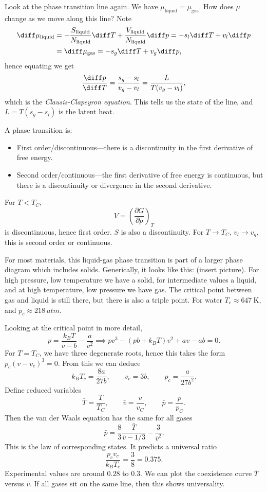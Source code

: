 \documentclass[12pt]{article}
\begin{document}
Look at the phase transition line again. We have $\mu_{\mathrm{liquid}}  = \mu_{\mathrm{gas}}$. How does $\mu$ change as we move along this line? Note
\begin{align*}
	\diff \mu_{\mathrm{liquid}} &= - \frac{S_{\mathrm{liquid}}}{N_{\mathrm{liquid}}} \diff T + \frac{V_{\mathrm{liquid}}}{N_{\mathrm{liquid}}} \diff p = - s_l \diff T + v_l \diff p \\
				    &= \diff \mu_{\mathrm{gas}} = - s_g \diff T + v_g \diff p,
\end{align*}
hence equating we get
\[
\frac{\diff p}{\diff T} = \frac{s_g - s_l}{v_g - v_l} = \frac{L}{T(v_g - v_l)},
\]
which is the \emph{Clausis-Clapeyron equation}. This tells us the state of the line, and $L = T(s_g - s_l)$ is the latent heat.

A phase transition is:
\begin{itemize}
	\item First order/discontinuous---there is a discontinuity in the first derivative of free energy.
	\item Second order/continuous---the first derivative of free energy is continuous, but there is a discontinuity or divergence in the second derivative.
\end{itemize}
For $T < T_C$,
\[
V = \left( \frac{\partial G}{\partial p} \right)_T
\]
is discontinuous, hence first order. $S$ is also a discontinuity. For $T \to T_C$, $v_l \to v_g$, this is second order or continuous.

For most materials, this liquid-gas phase transition is part of a larger phase diagram which includes solids. Generically, it looks like this: (insert picture). For high pressure, low temperature we have a solid, for intermediate values a liquid, and at high temperature, low pressure we have gas. The critical point between gas and liquid is still there, but there is also a triple point. For water $T_c \approx \qty{647}{\kelvin}$, and $p_c \approx \qty{218}{atm}$.

Looking at the critical point in more detail,
 \[
p = \frac{k_B T}{v - b} - \frac{a}{v^2} \implies pv^3 - (pb + k_B T)v^2 + av - ab = 0.
\]
For $T = T_C$, we have three degenerate roots, hence this takes the form $p_c(v - v_c)^3 = 0$. From this we can deduce
\[
k_B T_c = \frac{8a}{27b}, \qquad v_c = 3b, \qquad p_c = \frac{a}{27b^2}.
\]
Define reduced variables
\[
\bar T= \frac{T}{T_C}, \qquad \bar v = \frac{v}{v_C}, \qquad \bar p = \frac{p}{p_C}.
\]
Then the van der Waals equation has the same for all gases
\[
\bar p = \frac{8}{3} \frac{\bar T}{\bar v - 1/3} - \frac{3}{\bar v^2}.
\]
This is the law of corresponding states. It predicts a universal ratio
\[
\frac{p_cv_c}{k_B T_c} = \frac{3}{8} = 0.375.
\]
Experimental values are around $0.28$ to $0.3$. We can plot the coexistence curve $\bar T$ versus $\bar v$. If all gases sit on the same line, then this shows universality.
\end{document}
